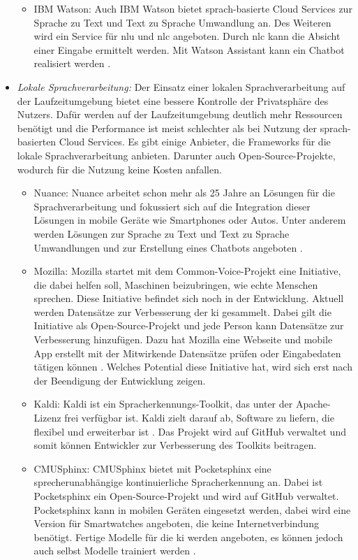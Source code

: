 \begin{itemize}
\begin{itemize}
		\item IBM Watson: Auch IBM Watson bietet sprach-basierte Cloud Services zur Sprache zu Text und Text zu Sprache Umwandlung an. Des Weiteren wird ein Service für \ac{nlu} und \ac{nlc} angeboten. Durch \ac{nlc} kann die Absicht einer Eingabe ermittelt werden. Mit Watson Assistant kann ein Chatbot realisiert werden \cite{IBMWatsonSpeechServices}.
	\end{itemize}
	\item \textsl{Lokale Sprachverarbeitung:} Der Einsatz einer lokalen Sprachverarbeitung auf der Laufzeitumgebung bietet eine bessere Kontrolle der Privatsphäre des Nutzers. Dafür werden auf der Laufzeitumgebung deutlich mehr Ressourcen benötigt und die Performance ist meist schlechter als bei Nutzung der sprach-basierten Cloud Services. Es gibt einige Anbieter, die Frameworks für die lokale Sprachverarbeitung anbieten. Darunter auch Open-Source-Projekte, wodurch für die Nutzung keine Kosten anfallen. 
	\begin{itemize}
		\item Nuance: Nuance arbeitet schon mehr als 25 Jahre an Lösungen für die Sprachverarbeitung und fokussiert sich auf die Integration dieser Lösungen in mobile Geräte wie Smartphones oder Autos. Unter anderem werden Lösungen zur Sprache zu Text und Text zu Sprache Umwandlungen und zur Erstellung eines Chatbots angeboten \cite{Nuance}. 
		\item Mozilla: Mozilla startet mit dem Common-Voice-Projekt eine Initiative, die dabei helfen soll, Maschinen beizubringen, wie echte Menschen sprechen. Diese Initiative befindet sich noch in der Entwicklung. Aktuell werden Datensätze zur Verbesserung der \ac{ki} gesammelt. Dabei gilt die Initiative als Open-Source-Projekt und jede Person kann Datensätze zur Verbesserung hinzufügen. Dazu hat Mozilla eine Webseite und mobile App erstellt mit der Mitwirkende Datensätze prüfen oder Eingabedaten tätigen können \cite{MozillaCommonVoice}. Welches Potential diese Initiative hat, wird sich erst nach der Beendigung der Entwicklung zeigen.
		\item Kaldi: Kaldi ist ein Spracherkennungs-Toolkit, das unter der Apache-Lizenz frei verfügbar ist. Kaldi zielt darauf ab, Software zu liefern, die flexibel und erweiterbar ist \cite{Kaldi}. Das Projekt wird auf GitHub verwaltet und somit können Entwickler zur Verbesserung des Toolkits beitragen.
		\item CMUSphinx: CMUSphinx bietet mit Pocketsphinx eine sprecherunabhängige kontinuierliche Spracherkennung an. Dabei ist Pocketsphinx ein Open-Source-Projekt und wird auf GitHub verwaltet. Pocketsphinx kann in mobilen Geräten eingesetzt werden, dabei wird eine Version für Smartwatches angeboten, die keine Internetverbindung benötigt. Fertige Modelle für die \ac{ki} werden angeboten, es können jedoch auch selbst Modelle trainiert werden \cite{Pocketsphinx}.
	\end{itemize}
\end{itemize}

